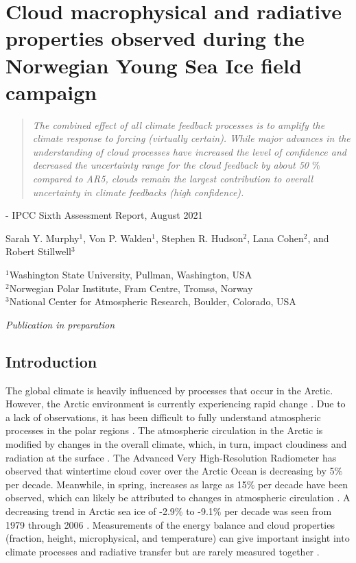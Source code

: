 \chapter{Cloud macrophysical and radiative properties observed during the Norwegian Young Sea Ice field campaign}
\vspace{1 cm}
\begin{spacing}{1} \begin{quote} 
\noindent \emph{The combined effect of all climate feedback processes is to amplify the climate response to forcing (virtually certain). While major advances in the understanding of cloud processes have increased the level of confidence and decreased the uncertainty range for the cloud feedback by about 50 $\%$ compared to AR5, clouds remain the largest contribution to overall uncertainty in climate feedbacks (high confidence).} \end{quote}
\hspace{6 cm} - IPCC Sixth Assessment Report, August 2021  
\end{spacing}
\vspace{1 cm}
\noindent Sarah Y. Murphy$^1$, Von P. Walden$^1$, Stephen R. Hudson$^2$, Lana Cohen$^2$, and Robert Stillwell$^3$ 


\noindent $^1$Washington State University, Pullman, Washington, USA\\
$^2$Norwegian Polar Institute, Fram Centre, Tromsø, Norway\\
$^3$National Center for Atmospheric Research, Boulder, Colorado, USA\\

\begin{center}
    \emph{Publication in preparation}
\end{center}

\section{Introduction}
The global climate is heavily influenced by processes that occur in the Arctic. However, the Arctic environment is currently experiencing rapid change \citep{overland:2011, stroeve:2007}. Due to a lack of observations, it has been difficult to fully understand atmospheric processes in the polar regions \citep{persson:2002}. The atmospheric circulation in the Arctic is modified by changes in the overall climate, which, in turn, impact cloudiness and radiation at the surface \citep{zhang:2008}. The Advanced Very High-Resolution Radiometer has observed that wintertime cloud cover over the Arctic Ocean is decreasing by 5$\%$ per decade. Meanwhile, in spring, increases as large as 15$\%$ per decade have been observed, which can likely be attributed to changes in atmospheric circulation \citep{schweiger:2004}. A decreasing trend in Arctic sea ice of -2.9$\%$ to -9.1$\%$ per decade was seen from 1979 through 2006 \citep{stroeve:2007}. Measurements of the energy balance and cloud properties (fraction, height, microphysical, and temperature) can give important insight into climate processes and radiative transfer but are rarely measured together \citep{persson:2002, schweiger:2004, miller:2017}. 

